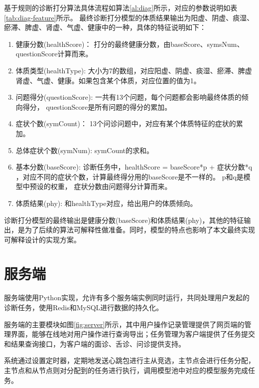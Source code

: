 基于规则的诊断打分算法具体流程如算法\ref{al:diag}所示，对应的参数说明如表\ref{tab:diag-feature}所示。
最终诊断打分模型的体质结果输出为阳虚、阴虚、痰湿、瘀滞、脾虚、肾虚、气虚、健康中的一种，具体的特征说明如下：
\begin{enumerate}
    \item 健康分数(healthScore)： 打分的最终健康分数，由baseScore、symsNum、questionScore计算而来。

    \item 体质类型(healthType): 大小为7的数组，对应阳虚、阴虚、痰湿、瘀滞、脾虚肾虚、气虚、健康。如果包含某个体质，对应位置的值为1。

    \item 问题得分(questionScore): 一共有13个问题，每个问题都会影响最终体质的倾向得分， questionScore是所有问题的得分的累加。

    \item 症状个数(symCount)： 13个问诊问题中，对应有某个体质特征的症状的累加。

    \item 总体症状个数(symNum): symCount的求和。

    \item 基本分数(baseScore): 诊断任务中，healthScore = baseScore*p + 症状分数*q ，对应不同的症状个数，计算最终得分用的baseScore是不一样的。 
p和q是模型中预设的权重， 症状分数由问题得分计算而来。

    \item 体质结果(phy): 和healthType对应，给出用户的体质倾向。
\end{enumerate}

诊断打分模型的最终输出是健康分数(baseScore)和体质结果(phy)，其他的特征输出，是为了后续的算法可解释性做准备。同时，模型的特点也影响了本文最终实现可解释设计的实现方案。


\section{服务端}

服务端使用Python实现，允许有多个服务端实例同时运行，共同处理用户发起的诊断任务，使用Redis和MySQL进行数据的持久化。    

服务端的主要模块如图\ref{fig:server}所示，其中用户操作记录管理提供了网页端的管理界面，能够在线地对用户操作进行查询导出；任务管理为客户端提供了任务提交和结果查询接口，为客户端的面诊、舌诊、问诊提供支持。

系统通过设置定时器，定期地发送心跳包进行主从竞选，主节点会进行任务分配，主节点和从节点则对分配到的任务进行执行，调用模型池中对应的模型服务完成任务。


